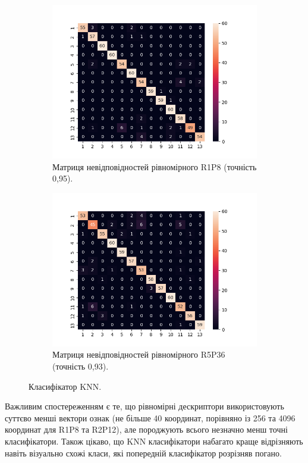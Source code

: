 \begin{figure}[h]
    \begin{subfigure}{0.5\textwidth}
    \includegraphics[width=0.95\linewidth]{img/confusion/knn-hist_R1_P8_u.png}
    \caption{
        Матриця невідповідностей рівномірного R1P8 (точність 0,95).
    }
    \end{subfigure}%
    \begin{subfigure}{0.5\textwidth}
    \includegraphics[width=0.95\linewidth]{img/confusion/knn-hist_R5_P36_u.png}
    \caption{
        Матриця невідповідностей рівномірного R5P36 (точність 0,93).
    }
    \end{subfigure}%
    
    \caption{Класифікатор KNN.}
    \label{fig:precision-2}
\end{figure}

Важливим спостереженням є те, що рівномірні дескриптори використовують суттєво менші вектори ознак 
(не більше 40 координат, порівняно із 256 та 4096 координат для R1P8 та R2P12), 
але породжують всього незначно менш точні класифікатори.
Також цікаво, що KNN класифікатори набагато краще відрізняють навіть візуально схожі класи, які попередній класифікатор розрізняв погано.


